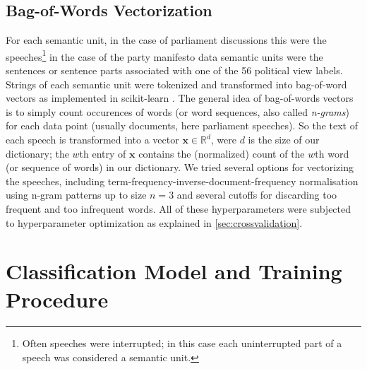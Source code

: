 \documentclass[runningheads,a4paper]{llncs}
\renewcommand{\vec}[1]{\mathbf{#1}}
\begin{document}
\subsection{Bag-of-Words Vectorization}\label{sec:bow-vectorization}
For each semantic unit, in the case of parliament discussions this were the speeches\footnote{Often speeches were interrupted; in this case each uninterrupted part of a speech was considered a semantic unit.} in the case of the party manifesto data semantic units were the sentences or sentence parts associated with one of the 56 political view labels. Strings of each semantic unit were tokenized and transformed into bag-of-word vectors as implemented in scikit-learn \cite{scikit-learn}. The general idea of bag-of-words vectors is to simply count occurences of words (or word sequences, also called {\em n-grams}) for each data point (usually documents, here parliament speeches). So the text of each speech is transformed into a vector $\vec{x}\in\mathds{R}^d$, were $d$ is the size of our dictionary; the $w$th entry of $\vec{x}$ contains the (normalized) count of the $w$th word (or sequence of words) in our dictionary. We tried several options for vectorizing the speeches, including term-frequency-inverse-document-frequency normalisation using n-gram patterns up to size $n=3$ and several cutoffs for discarding too frequent and too infrequent words. All of these hyperparameters were subjected to hyperparameter optimization as explained in \autoref{sec:crossvalidation}. 


\section{Classification Model and Training Procedure}\label{sec:model}
\end{document}
